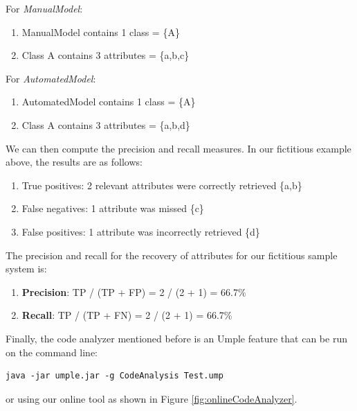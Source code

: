 For \textit{ManualModel}:
\begin{enumerate}
\item ManualModel contains 1 class = \{A\}
\item Class A contains 3 attributes = \{a,b,c\}
\end{enumerate}

For \textit{AutomatedModel}:
\begin{enumerate}
\item AutomatedModel contains 1 class = \{A\}
\item Class A contains 3 attributes = \{a,b,d\}
\end{enumerate}

We can then compute the precision and recall measures. In our fictitious example above, the results are as follows:

\begin{enumerate}
\item True positives: 2 relevant attributes were correctly retrieved \{a,b\}
\item False negatives:  1 attribute was missed \{c\}
\item False positives: 1 attribute was incorrectly retrieved \{d\}
\end{enumerate}

The precision and recall for the recovery of attributes for our fictitious sample system is:


\begin{enumerate}
\item \textbf{Precision}: TP / (TP + FP) = 2 / (2 + 1) = 66.7\%
\item \textbf{Recall}: TP / (TP + FN) =  2 / (2 + 1) = 66.7\%
\end{enumerate}

Finally, the code analyzer mentioned before is an Umple feature that can be run on the command line:

\vspace{\baselineskip}
\begin{lstlisting}[style=umplePlain]
   java -jar umple.jar -g CodeAnalysis Test.ump
\end{lstlisting}
or using our online tool as shown in Figure \ref{fig:onlineCodeAnalyzer}.

